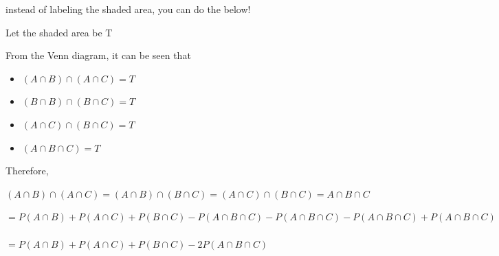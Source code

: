 \documentclass{article}
\begin{document}
{instead of labeling the shaded area, you can do the below!}

{Let the shaded area be } T

{From the Venn diagram, it can be seen that}

\begin{itemize}
    \item $(A \cap B) \cap (A \cap C) = T$
    \item $(B \cap B) \cap (B \cap C) = T$
    \item $(A \cap C) \cap (B \cap C) = T$
    \item $(A \cap B \cap C) = T$
\end{itemize}

{Therefore,}

$(A \cap B) \cap (A \cap C) = (A \cap B) \cap (B \cap C)
= (A \cap C) \cap (B \cap C) = A \cap B \cap C$



$= P(A \cap B) + P(A \cap C) + P(B \cap C) - P(A \cap B \cap C) - P(A \cap B \cap C) - P(A \cap B \cap C) + P(A \cap B \cap C)$
\\ \\
$= P(A \cap B) + P(A \cap C) + P(B \cap C) - 2P(A \cap B \cap C)$
\\ \\
\end{document}
